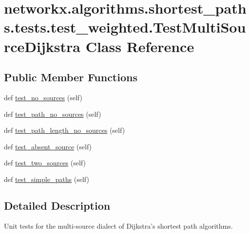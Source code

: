 \hypertarget{classnetworkx_1_1algorithms_1_1shortest__paths_1_1tests_1_1test__weighted_1_1TestMultiSourceDijkstra}{}\section{networkx.\+algorithms.\+shortest\+\_\+paths.\+tests.\+test\+\_\+weighted.\+Test\+Multi\+Source\+Dijkstra Class Reference}
\label{classnetworkx_1_1algorithms_1_1shortest__paths_1_1tests_1_1test__weighted_1_1TestMultiSourceDijkstra}
\subsection*{Public Member Functions}
\begin{DoxyCompactItemize}
\item 
def \hyperlink{classnetworkx_1_1algorithms_1_1shortest__paths_1_1tests_1_1test__weighted_1_1TestMultiSourceDijkstra_aed7a8d822f481ccdfcbf6ea91f3414ca}{test\+\_\+no\+\_\+sources} (self)
\item 
def \hyperlink{classnetworkx_1_1algorithms_1_1shortest__paths_1_1tests_1_1test__weighted_1_1TestMultiSourceDijkstra_a12f238fe633f0c316e3f9862e39eca13}{test\+\_\+path\+\_\+no\+\_\+sources} (self)
\item 
def \hyperlink{classnetworkx_1_1algorithms_1_1shortest__paths_1_1tests_1_1test__weighted_1_1TestMultiSourceDijkstra_a19ad93cbbcd1991bc160ff55b5e05f1a}{test\+\_\+path\+\_\+length\+\_\+no\+\_\+sources} (self)
\item 
def \hyperlink{classnetworkx_1_1algorithms_1_1shortest__paths_1_1tests_1_1test__weighted_1_1TestMultiSourceDijkstra_acf9cbbc1ff311b608ac9ca698037bb94}{test\+\_\+absent\+\_\+source} (self)
\item 
def \hyperlink{classnetworkx_1_1algorithms_1_1shortest__paths_1_1tests_1_1test__weighted_1_1TestMultiSourceDijkstra_a3d2a8b754ee02ef32329d15f2f888b48}{test\+\_\+two\+\_\+sources} (self)
\item 
def \hyperlink{classnetworkx_1_1algorithms_1_1shortest__paths_1_1tests_1_1test__weighted_1_1TestMultiSourceDijkstra_aa8d7f8bf9948f4b674fef923642eb5ec}{test\+\_\+simple\+\_\+paths} (self)
\end{DoxyCompactItemize}


\subsection{Detailed Description}
\begin{DoxyVerb}Unit tests for the multi-source dialect of Dijkstra's shortest
path algorithms.\end{DoxyVerb}
 

